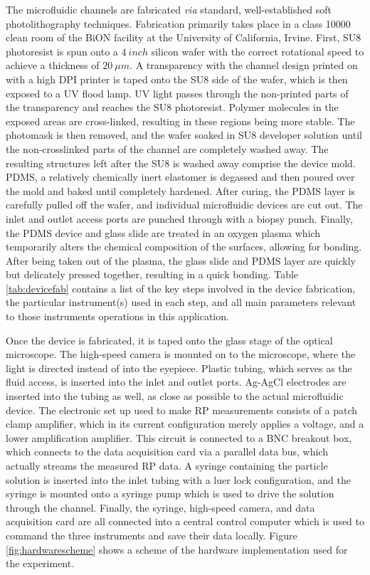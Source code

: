 		The microfluidic channels are fabricated \textit{via} standard, well-established soft photolithography techniques. Fabrication primarily takes place in a class 10000 clean room of the BiON facility at the University of California, Irvine. First, SU8 photoresist is spun onto a $\SI{4}{inch}$ silicon wafer with the correct rotational speed to achieve a thickness of $\SI{20}{\mu m}$. A transparency with the channel design printed on with a high DPI printer is taped onto the SU8 side of the wafer, which is then exposed to a UV flood lamp. UV light passes through the non-printed parts of the transparency and reaches the SU8 photoresist. Polymer molecules in the exposed areas are cross-linked, resulting in these regions being more stable. The photomask is then removed, and the wafer soaked in SU8 developer solution until the non-crosslinked parts of the channel are completely washed away. The resulting structures left after the SU8 is washed away comprise the device mold. PDMS, a relatively chemically inert elastomer is degassed and then poured over the mold and baked until completely hardened. After curing, the PDMS layer is carefully pulled off the wafer, and individual microfluidic devices are cut out. The inlet and outlet access ports are punched through with a biopsy punch. Finally, the PDMS device and glass slide are treated in an oxygen plasma which temporarily alters the chemical composition of the surfaces, allowing for bonding. After being taken out of the plasma, the glass slide and PDMS layer are quickly but delicately pressed together, resulting in a quick bonding. Table \ref{tab:devicefab} contains a list of the key steps involved in the device fabrication, the particular instrument(s) used in each step, and all main parameters relevant to those instruments operations in this application.
		
		Once the device is fabricated, it is taped onto the glass stage of the optical microscope. The high-speed camera is mounted on to the microscope, where the light is directed instead of into the eyepiece. Plastic tubing, which serves as the fluid access, is inserted into the inlet and outlet ports. Ag-AgCl electrodes are inserted into the tubing as well, as close as possible to the actual microfluidic device. The electronic set up used to make RP measurements consists of a patch clamp amplifier, which in its current configuration merely applies a voltage, and a lower amplification amplifier. This circuit is connected to a BNC breakout box, which connects to the data acquisition card via a parallel data bus, which actually streams the measured RP data. A syringe containing the particle solution is inserted into the inlet tubing with a luer lock configuration, and the syringe is mounted onto a syringe pump which is used to drive the solution through the channel. Finally, the syringe, high-speed camera, and data acquisition card are all connected into a central control computer which is used to command the three instruments and save their data locally. Figure \ref{fig:hardwarescheme} shows a scheme of the hardware implementation used for the experiment.
		
